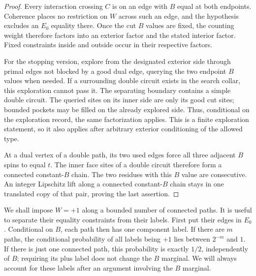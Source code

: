 \begin{proof}
Every interaction crossing $C$ is on an edge with $B$ equal at both
endpoints.  Coherence places no restriction on $W$ across such an edge,
and the hypothesis excludes an $E_0$ equality there.  Once the cut $B$
values are fixed, the counting weight therefore factors into an exterior
factor and the stated interior factor.  Fixed constraints inside and
outside occur in their respective factors.

For the stopping version, explore from the designated exterior side
through primal edges not blocked by a good dual edge, querying the two
endpoint $B$ values when needed.  If a surrounding double circuit exists
in the search collar, this exploration cannot pass it.  The separating
boundary contains a simple double circuit.  The queried sites on its
inner side are only its good cut sites; bounded pockets may be filled on
the already explored side.  Thus, conditional on the exploration record,
the same factorization applies.  This is a finite exploration statement,
so it also applies after arbitrary exterior conditioning of the allowed
type.

At a dual vertex of a double path, its two used edges force all three
adjacent $B$ spins to equal $t$.  The inner face sites of a double circuit
therefore form a connected constant-$B$ chain.  The two residues with this
$B$ value are consecutive.  An integer Lipschitz lift along a connected
constant-$B$ chain stays in one translated copy of that pair, proving the
last assertion.
\end{proof}

We shall impose $W=+1$ along a bounded number of connected paths.  It is
useful to separate their equality constraints from their labels.  First
put their edges in $E_0$.  Conditional on $B$, each path then has one
component label.  If there are $m$ paths, the conditional probability of
all labels being $+1$ lies between $2^{-m}$ and $1$.  If there is just one
connected path, this probability is exactly $1/2$, independently of $B$;
requiring its plus label does not change the $B$ marginal.  We will always
account for these labels after an argument involving the $B$ marginal.
